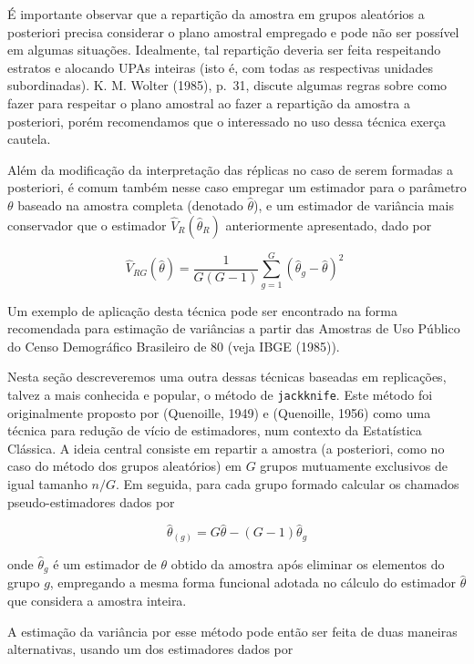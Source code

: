 \documentclass[
  12pt,
  brazilian,
]{book}
\theoremstyle{definition}
\theoremstyle{definition}
\theoremstyle{definition}
\theoremstyle{definition}
\theoremstyle{remark}
\begin{document}
É importante observar que a repartição da amostra em grupos aleatórios a posteriori precisa considerar o plano amostral empregado e pode não ser possível em algumas situações. Idealmente, tal repartição deveria ser feita respeitando estratos e alocando UPAs inteiras (isto é, com todas as respectivas unidades subordinadas). K. M. Wolter (1985), p.~31, discute algumas regras sobre como fazer para respeitar o plano amostral ao fazer a repartição da amostra a posteriori, porém recomendamos que o interessado no uso dessa técnica exerça cautela.

Além da modificação da interpretação das réplicas no caso de serem formadas a posteriori, é comum também nesse caso empregar um estimador para o parâmetro \(\theta\) baseado na amostra completa (denotado \(\widehat{\theta}\)), e um estimador de variância mais conservador que o estimador \(\widehat{V}_{R}\left( \widehat{\theta }_{R}\right)\) anteriormente apresentado, dado por

\[
\widehat{V}_{RG}\left( \widehat{\theta }\right) =\frac{1}{G\left( G-1\right) 
}\sum_{g=1}^{G}\left( \widehat{\theta }_{g}-\widehat{\theta }\right) ^{2} \,\,
\label{eq:estpa24}
\]

Um exemplo de aplicação desta técnica pode ser encontrado na forma recomendada para estimação de variâncias a partir das Amostras de Uso Público do Censo Demográfico Brasileiro de 80 (veja IBGE (1985)).

Nesta seção descreveremos uma outra dessas técnicas baseadas em replicações, talvez a mais conhecida e popular, o método de \texttt{jackknife}. Este método foi originalmente proposto por (Quenoille, 1949) e (Quenoille, 1956) como uma técnica para redução de vício de estimadores, num contexto da Estatística Clássica. A ideia central consiste em repartir a amostra (a posteriori, como no caso do método dos grupos aleatórios) em \(G\) grupos mutuamente exclusivos de igual tamanho \(n/G\). Em seguida, para cada grupo formado calcular os chamados pseudo-estimadores dados por

\[
\widehat{\theta }_{\left( g\right) }=G\widehat{\theta }-\left( G-1\right) 
\widehat{\theta }_{g} 
\]

onde \(\widehat{\theta }_{g}\) é um estimador de \(\theta\) obtido da amostra após eliminar os elementos do grupo \(g\), empregando a mesma forma funcional adotada no cálculo do estimador \(\widehat{\theta}\) que considera a amostra inteira.

A estimação da variância por esse método pode então ser feita de duas maneiras alternativas, usando um dos estimadores dados por
\end{document}
